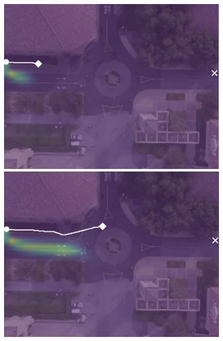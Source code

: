 \documentclass[letterpaper,10pt,conference]{ieeeconf}
\begin{document}
\begin{figure}
	\vspace{0.1cm}
	\begin{minipage}[c]{0.5cm}
	\end{minipage}
	\begin{minipage}[c]{0.3\linewidth}
		\includegraphics[width=\linewidth]{./figures/comparison/kit_death_1_2_t=70.jpg}
	\end{minipage}
	\begin{minipage}[c]{0.3\linewidth}
		\includegraphics[width=\linewidth]{./figures/comparison/kit_death_1_2_t=250.jpg}
	\end{minipage}
	\begin{minipage}[c]{0.3\linewidth}

\end{minipage}
\end{figure}
\end{document}
